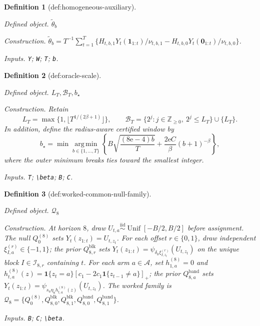 \documentclass{article}
\newtheorem{definition}{Definition}
\begin{document}
\begin{definition}[def:homogeneous-auxiliary]\label{def:homogeneous-auxiliary}
\par\smallskip\noindent\emph{Defined object.} \(\widetilde\theta_b\)
\par\smallskip\noindent\emph{Construction.} \(\widetilde\theta_b=T^{-1}\sum_{t=1}^T\{H_{t,b,1}Y_t(\mathbf 1_{1:t})/\nu_{t,b,1}-H_{t,b,0}Y_t(\mathbf 0_{1:t})/\nu_{t,b,0}\}\).
\par\smallskip\noindent\emph{Inputs.} \texttt{Y}; \texttt{W}; \texttt{T}; \texttt{b}.
\end{definition}

\begin{definition}[def:oracle-scale]\label{def:oracle-scale}
\par\smallskip\noindent\emph{Defined object.} \(L_T,\mathcal B_T,b_\star\)
\par\smallskip\noindent\emph{Construction.} Retain
\[
 L_T=\max\{1,\lfloor T^{1/(2\beta+1)}\rfloor\},
 \qquad
 \mathcal B_T=\{2^j:j\in\mathbb Z_{\ge0},\ 2^j\le L_T\}\cup\{L_T\}.
\]
In addition, define the radius-aware certified window by
\[
 b_\star
 =\min\operatorname*{arg\,min}_{b\in\{1,\ldots,T\}}
 \left\{
 B\sqrt{\frac{(8\mathrm e-4)b}{T}}
 +\frac{2\mathrm e C}{\beta}(b+1)^{-\beta}
 \right\},
\]
where the outer minimum breaks ties toward the smallest integer.
\par\smallskip\noindent\emph{Inputs.} \texttt{T}; \texttt{\textbackslash{}\allowbreak{}beta}; \texttt{B}; \texttt{C}.
\end{definition}

\begin{definition}[def:worked-common-null-family]\label{def:worked-common-null-family}
\par\smallskip\noindent\emph{Defined object.} \(\mathcal Q_8\)
\par\smallskip\noindent\emph{Construction.} At horizon \(8\), draw \(U_{t,a}\stackrel{\mathrm{iid}}{\sim}\operatorname{Unif}[-B/2,B/2]\) before assignment. The null \(Q_0^{(8)}\) sets \(Y_t(z_{1:t})=U_{t,z_t}\). For each offset \(r\in\{0,1\}\), draw independent \(\xi_{I,a}^{(r)}\in\{-1,1\}\); the prior \(Q_{8,r}^{\mathrm{blk}}\) sets \(Y_t(z_{1:t})=\psi_{\delta_8\xi_{I,z_t}^{(r)}}(U_{t,z_t})\) on the unique block \(I\in\mathcal I_{8,r}\) containing \(t\). For each arm \(a\in\mathcal A\), set \(h_{1,a}^{(8)}=0\) and \(h_{t,a}^{(8)}(z)=\mathbf 1\{z_t=a\}[c_1-2c_1\mathbf 1\{z_{t-1}\ne a\}]_+\); the prior \(Q_{8,a}^{\mathrm{band}}\) sets \(Y_t(z_{1:t})=\psi_{s_a\eta_8h_{t,a}^{(8)}(z)}(U_{t,z_t})\). The worked family is \(\mathcal Q_8=\{Q_0^{(8)},Q_{8,0}^{\mathrm{blk}},Q_{8,1}^{\mathrm{blk}},Q_{8,0}^{\mathrm{band}},Q_{8,1}^{\mathrm{band}}\}\).
\par\smallskip\noindent\emph{Inputs.} \texttt{B}; \texttt{C}; \texttt{\textbackslash{}\allowbreak{}beta}.
\end{definition}
\end{document}
